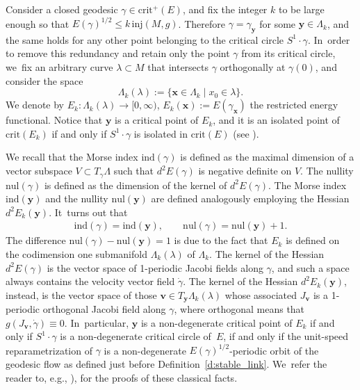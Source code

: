 \documentclass[11pt]{article}
\let\sep\mid
\let\bm\boldsymbol
\newcommand{\xx}{\bm{x}}
\newcommand{\yy}{\bm{y}}
\newcommand{\vv}{\bm{v}}
\newcommand{\crit}{\mathrm{crit}}
\newcommand{\ind}{\mathrm{ind}}
\newcommand{\inj}{\mathrm{inj}}
\newcommand{\nul}{\mathrm{nul}}
\theoremstyle{plain}
\theoremstyle{definition}
\begin{document}
Consider a closed geodesic $\gamma\in\crit^+(E)$, and fix the integer $k$ to be large enough so that $E(\gamma)^{1/2}\leq k\,\inj(M,g)$. Therefore $\gamma=\gamma_{\yy}$ for some $\yy\in\Lambda_k$, and the same holds for any other point belonging to the critical circle $S^1\cdot\gamma$. In~order to remove this redundancy and retain only the point $\gamma$ from its critical circle, we~fix an arbitrary curve $\lambda\subset M$ that intersects $\gamma$ orthogonally at $\gamma(0)$, and consider the space
\[
\Lambda_k(\lambda) :=\big\{ \xx\in\Lambda_k\sep x_0\in\lambda\big\}.
\]
We denote by $E_k:\Lambda_k(\lambda)\to[0,\infty)$, $E_k(\xx):=E(\gamma_{\xx})$ the restricted energy functional.
Notice that $\yy$ is a critical point of $E_k$, and it is an isolated point of $\crit(E_k)$ if and only if $S^1\cdot\gamma$ is isolated in $\crit(E)$ (see \cite[Prop.\,3.1]{Asselle:2018aa}).

We recall that the Morse index $\ind(\gamma)$ is defined as the maximal dimension of a vector subspace $V\subset T_\gamma \Lambda$ such that $d^2E(\gamma)$ is negative definite on $V$. The nullity $\nul(\gamma)$ is defined as the dimension of the kernel of $d^2E(\gamma)$.
The Morse index $\ind(\yy)$ and the nullity $\nul(\yy)$ are defined analogously employing the Hessian $d^2E_k(\yy)$. It~turns out that
\begin{align*}
\ind(\gamma)=\ind(\yy),\qquad
\nul(\gamma)=\nul(\yy)+1.
\end{align*}
The difference $\nul(\gamma)-\nul(\yy)=1$ is due to the fact that $E_k$ is defined on the codimension one submanifold $\Lambda_k(\lambda)$ of $\Lambda_k$.
The kernel of the Hessian $d^2E(\gamma)$ is the vector space of 1-periodic Jacobi fields along $\gamma$, and such a space always contains the velocity vector field $\dot\gamma$. The kernel of the Hessian $d^2E_k(\yy)$, instead, is the vector space of those $\bm v\in T_{\yy}\Lambda_k(\lambda)$ whose associated $J_{\vv}$ is a 1-periodic orthogonal Jacobi field along $\gamma$, where orthogonal means that $g(J_{\vv},\dot\gamma)\equiv0$. In~particular, $\yy$ is a non-degenerate critical point of $E_k$ if and only if $S^1\cdot\gamma$ is a non-degenerate critical circle of~$E$, if and only if the unit-speed reparametrization of $\gamma$ is a non-degenerate $E(\gamma)^{1/2}$-periodic orbit of the geodesic flow as defined just before Definition~\ref{d:stable_link}. We~refer the reader to, e.g., \cite[\S 4]{Mazzucchelli:2016aa}), for the proofs of these classical facts.
\end{document}
